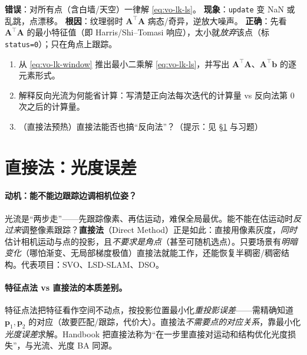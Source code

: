 \begin{pitfall}
\textbf{错误}：对所有点（含白墙/天空）一律解 \cref{eq:vo-lk-ls}。
\textbf{现象}：\texttt{update} 变 NaN 或乱跳，点漂移。
\textbf{根因}：纹理弱时 $\mathbf{A}^\top\mathbf{A}$ 病态/奇异，逆放大噪声。
\textbf{正确}：先看 $\mathbf{A}^\top\mathbf{A}$ 的最小特征值（即 Harris/Shi--Tomasi 响应），太小就\emph{放弃}该点（标 \texttt{status=0}）；只在角点上跟踪。
\end{pitfall}

\begin{practice}
\begin{enumerate}
  \item 从 \cref{eq:vo-lk-window} 推出最小二乘解 \cref{eq:vo-lk-ls}，并写出 $\mathbf{A}^\top\mathbf{A}$、$\mathbf{A}^\top\mathbf{b}$ 的逐元素形式。
  \item 解释反向光流为何能省计算：写清楚正向法每次迭代的计算量 vs 反向法第 $0$ 次之后的计算量。
  \item （直接法预热）直接法能否也搞“反向法”？（提示：见 §\ref{sec:vo-direct} 与习题）
\end{enumerate}
\end{practice}

\section{直接法：光度误差}
\label{sec:vo-direct}

\paragraph{动机：能不能边跟踪边调相机位姿？}光流是“两步走”——先跟踪像素、再估运动，难保全局最优\cite{gaoxiang2019slam14}。能不能在估运动时\emph{反过来}调整像素跟踪？\textbf{直接法}（Direct Method）正是如此：直接用像素灰度，\emph{同时}估计相机运动与点的投影，且\emph{不要求是角点}（甚至可随机选点）。只要场景有\emph{明暗变化}（哪怕渐变、无局部梯度极值）直接法就能工作，还能恢复半稠密/稠密结构。代表项目：SVO、LSD-SLAM、DSO\cite{gaoxiang2019slam14,carlone2026handbook}。

\paragraph{特征点法 vs 直接法的本质差别\cite{gaoxiang2019slam14,carlone2026handbook}。}特征点法把特征看作空间不动点，按投影位置最小化\emph{重投影误差}——需精确知道 $\mathbf{p}_1,\mathbf{p}_2$ 的对应（故要匹配/跟踪，代价大）。直接法\emph{不需要点的对应关系}，靠最小化\emph{光度误差}求解。Handbook\cite{carlone2026handbook} 把直接法称为“在一步里直接对运动和结构优化光度损失”，与光流、光度 BA 同源。


